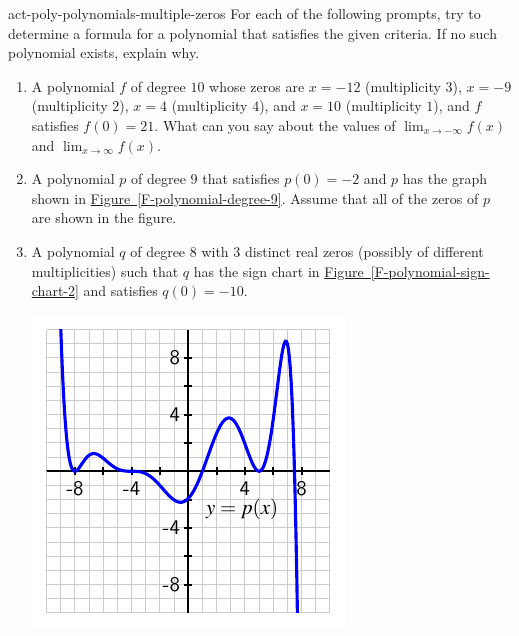 \documentclass{ximera}
\begin{document}
\begin{exploration}{}{act-poly-polynomials-multiple-zeros}%
For each of the following prompts, try to determine a formula for a polynomial that satisfies the given criteria.  If no such polynomial exists, explain why.%

\begin{enumerate}[label=\alph*.]
\item A polynomial $f$ of degree $10$ whose zeros are $x = -12$ (multiplicity $3$), $x = -9$ (multiplicity $2$), $x = 4$ (multiplicity $4$), and $x = 10$ (multiplicity $1$), and $f$ satisfies $f(0) = 21$.  What can you say about the values of $\lim_{x \to -\infty} f(x)$ and $\lim_{x \to \infty} f(x)$.%
\item A polynomial $p$ of degree $9$ that satisfies $p(0) = -2$ and $p$ has the graph shown in \hyperref[F-polynomial-degree-9]{Figure~\ref{F-polynomial-degree-9}}.  Assume that all of the zeros of $p$ are shown in the figure.%
\item A polynomial $q$ of degree $8$ with $3$ distinct real zeros (possibly of different multiplicities) such that $q$ has the sign chart in \hyperref[F-polynomial-sign-chart-2]{Figure~\ref{F-polynomial-sign-chart-2}} and satisfies $q(0) = -10$.%
\begin{image}
\includegraphics[width=1\linewidth]{images/poly-degree-9}

\end{image}
\end{enumerate}
\end{exploration}
\end{document}
